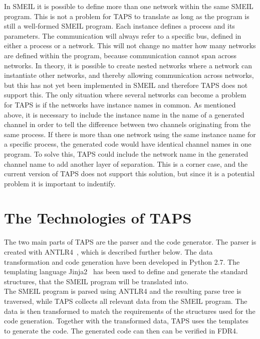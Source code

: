 In SMEIL it is possible to define more than one network within the same SMEIL program. This is not a problem for TAPS to translate as long as the program is still a well-formed SMEIL program. Each instance defines a process and its parameters. The communication will always refer to a specific bus, defined in either a process or a network. This will not change no matter how many networks are defined within the program, because communication cannot span across networks.
In theory, it is possible to create nested networks where a network can instantiate other networks, and thereby allowing communication across networks, but this has not yet been implemented in SMEIL and therefore TAPS does not support this.
The only situation where several networks can become a problem for TAPS is if the networks have instance names in common. As mentioned above, it is necessary to include the instance name in the name of a generated \cspm{} channel in order to tell the difference between two \cspm{} channels originating from the same process. If there is more than one network using the same instance name for a specific process, the generated code would have identical channel names in one \cspm{} program. To solve this, TAPS could include the network name in the generated \cspm{} channel name to add another layer of separation. This is a corner case, and the current version of TAPS does not support this solution, but since it is a potential problem it is important to indentify.

\section{The Technologies of TAPS}
The two main parts of TAPS are the parser and the code generator. The parser is created with ANTLR4~\cite{Parr2012}, which is described further below. The data transformation and code generation have been developed in Python 2.7. The templating language Jinja2~\cite{jinja2} has been used to define and generate the standard \cspm{} structures, that the SMEIL program will be translated into.\\

The SMEIL program is parsed using ANTLR4 and the resulting parse tree is traversed, while TAPS collects all relevant data from the SMEIL program. The data is then transformed to match the requirements of the \cspm{} structures used for the code generation. Together with the transformed data, TAPS uses the templates to generate the \cspm{} code. The generated code can then can be verified in FDR4. \\

